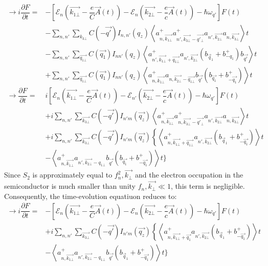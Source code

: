\documentclass{article}
\begin{document}
\begin{align*}
    \rightarrow i \dfrac{\partial F}{\partial t} = & - \left[\mathcal{E}_{n} \left(\vec{k_{1\bot}} - \dfrac{e}{C} \vec{A} (t) \right) - \mathcal{E}_{n} \left(\vec{k_{2\bot}}-\dfrac{e}{c} \vec{A}(t) \right)- \hbar \omega_{q'}\right] F(t) \\
     & - \sum_{n,n'} \sum_{k_{3\bot}} C \left(- \vec{q'}\right) I _{n,n'} \left(q_z\right) \left \langle a^+_{n, \vec{k_{1\bot}}} a^+_{n', \vec{k_{3\bot}} - \vec{q'_{\bot}}}a_{n', \vec{k_{2\bot}}} a_{n, \vec{k_{3\bot}}}\right \rangle t \\
    & - \sum_{n,n'} \sum_{\vec{q_{1\bot}}} C \left(\vec{q_1}\right) I_{n n'} \left(q_z \right) \left \langle a^+_{n', \vec{k_{1\bot}} + \vec{q_{1\bot}}} a_{n', \vec{k_{2\bot}}}\left(b_{\vec{q}_{1}}+ b^+_{-q_1}\right) b_{\vec{q'}}\right \rangle t \\
    & + \sum_{n,n'} \sum_{\vec{q_{1\bot}}} C \left(\vec{q_1} \right) I_{nn'} \left(q_z\right) \left \langle a^+_{n, \vec{k_{1\bot}}} a_{n, \vec{k_{2\bot}} - \vec{q_{1\bot}}} b_{\vec{q'}} \left(b_{\vec{q_1}}+b^+_{- \vec{q_1}}\right) \right \rangle t \\
   \rightarrow \dfrac{\partial F}{\partial t} = & i \left[\mathcal{E}_{n} \left(\vec{k_{1\bot}} - \dfrac{e}{C} \vec{A} (t) \right) - \mathcal{E}_{n'} \left(\vec{k_{2\bot}}-\dfrac{e}{c} \vec{A}(t) \right)- \hbar \omega_{q'}\right] F(t) \\
   & + i \sum_{n,n'} \sum_{\vec{k_{3\bot}}} C \left(-\vec{q'}\right) I_{n'm} \left(\vec{q_z}\right) \left\langle a^+_{n, \vec{k_{1\bot}}}a^+_{n, \vec{k_{3\bot}} - \vec{q'_{\bot}}}a_{n', \vec{k_{2\bot}}} a_{n, \vec{k_{3\bot}}}\right\rangle t \\
   & + i \sum_{n,n'} \sum_{\vec{k_{3\bot}}} C \left(-\vec{q'}\right) I_{n'm}\left(\vec{q_z}\right) \left\{\left\langle a^+_{n, \vec{k_{1\bot}} + \vec{q_{1\bot}}}a_{n', \vec{k_{2\bot}}}\left(b_{\vec{q}_1}+ b^+_{- \vec{q_1}}\right)\right\rangle t \right. \\
   & -\left \langle a^+_{n, \vec{k_{1\bot}}} a_{n', \vec{k_{2\bot}} - q_{1\bot}}b_{\vec{q'}} \left(b_{\vec{q_1}}+ b^+_{- \vec{q_1}}\right)\right \rangle t\}
\end{align*}
Since $S_2$ is approximately equal to $f^2_n, \vec{k_\bot}$ and the electron occupation in the semiconductor is much smaller than unity $f_n,\vec{k_\bot} \ll 1$, this term is negligible. Consequently, the time-evolution equatiuon reduces to:
\begin{align*}
    \rightarrow i \dfrac{\partial F}{\partial t} = & - \left[\mathcal{E}_{n} \left(\vec{k_{1\bot}} - \dfrac{e}{C} \vec{A} (t) \right) - \mathcal{E}_{n} \left(\vec{k_{2\bot}}-\dfrac{e}{c} \vec{A}(t) \right)- \hbar \omega_{q'}\right] F(t) \\
    & + i \sum_{n,n'} \sum_{\vec{k_{3\bot}}} C \left(-\vec{q'}\right) I_{n'm}\left(\vec{q_z}\right) \left\{\left\langle a^+_{n, \vec{k_{1\bot}} + \vec{q_{1}}} a_{n', \vec{k_{2\bot}}}\left(b_{\vec{q}_1}+ b^+_{- \vec{q_1}}\right)\right\rangle t \right. \\
   & - \left \langle a^+_{n, \vec{k_{1\bot}}} a_{n', \vec{k_{2\bot}}- q_{1\bot}}b_{\vec{q'}} \left(b_{\vec{q}_1}+ b^+_{-\vec{q_1}}\right)\right \rangle t \}
\end{align*}
\end{document}
